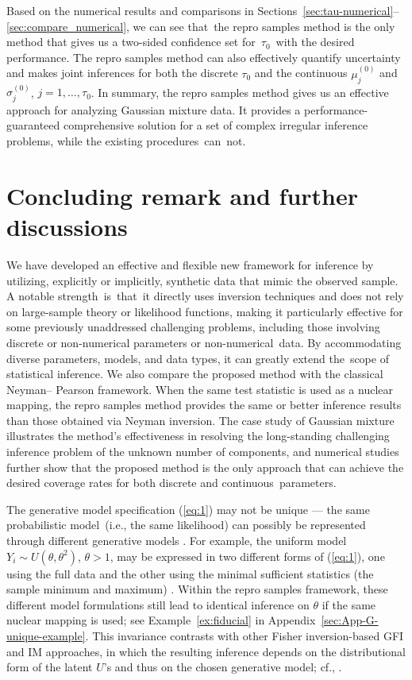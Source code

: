 \documentclass[12pt]{article}
\theoremstyle{shortspace}
\begin{document}
Based on the numerical results and comparisons in Sections~\ref{sec:tau-numerical}--\ref{sec:compare_numerical}, we can see that~the repro samples method is the only method that gives us a two-sided confidence set for~$\tau_0$~with the desired performance. The repro samples method can also effectively quantify uncertainty and makes joint inferences for both the discrete $\tau_0$ and the continuous  $\mu_j^{(0)}$ and $\sigma_j^{(0)}$, $j = 1, \ldots, \tau_0$. In summary, the repro samples method gives us an effective approach for analyzing Gaussian mixture data. It provides a performance-guaranteed comprehensive solution for a set of complex irregular inference problems, while the existing procedures~can~not. 






\section{Concluding remark and further discussions}
\label{sec:6}

We have developed an effective and flexible new  framework for inference by utilizing, explicitly or implicitly, synthetic data that mimic the observed sample. A notable strength~is~that~it directly uses inversion techniques and does not rely on large-sample theory or likelihood functions, making it particularly effective for some previously unaddressed challenging  
problems, including those involving discrete or non-numerical parameters or non-numerical~data. By accommodating diverse parameters, models, and data types, it can greatly extend the~scope of statistical inference. We also compare the proposed method with the classical Neyman– Pearson framework. When the same test statistic is used as a nuclear mapping, the repro samples method provides  the same or better inference results than those obtained via Neyman inversion. The case study of Gaussian mixture  illustrates the method’s effectiveness in resolving the long-standing challenging inference problem of the unknown number of components, and  numerical studies further show that the proposed method is the only approach that can achieve the desired coverage rates for both discrete and continuous~parameters.


The generative model specification (\ref{eq:1}) may not be  unique --- the same probabilistic model~(i.e., the same likelihood) can possibly be represented through different generative models \citep[Remark~6]{Hannig2009}. For example, the uniform model $Y_i \sim U(\theta,\theta^2)$, $\theta>1$,  may be expressed in two different forms of (\ref{eq:1}), one using the full data and the other using the minimal sufficient statistics (the sample minimum and maximum) \citep[Example~4]{Hannig2016}. Within the repro samples framework, these different model formulations still lead to identical inference on $\theta$ if the same nuclear mapping is used; see Example~\ref{ex:fiducial} in Appendix~\ref{sec:App-G-unique-example}. This invariance 
contrasts with other Fisher inversion-based GFI and IM approaches, in which the resulting inference depends on the distributional form of the latent $U$'s and thus on the chosen generative model; cf., \cite{Hannig2016,martin2013inferential}.
\end{document}

